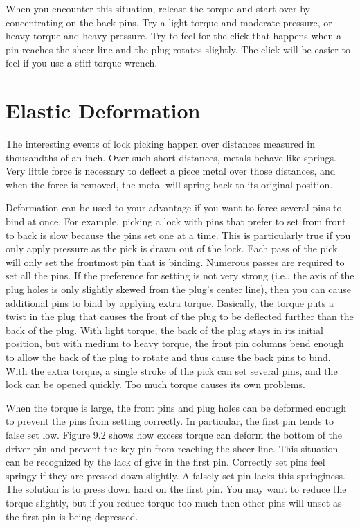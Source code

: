 When you encounter this situation, release the torque and start over by concentrating 
on the back pins. Try a light torque and moderate pressure, or heavy torque and heavy 
pressure. Try to feel for the click that happens when a pin reaches the sheer line and the 
plug rotates slightly. The click will be easier to feel if you use a stiff torque wrench.

\section{Elastic Deformation}
The interesting events of lock picking happen over distances measured in thousandths of an 
inch. Over such short distances, metals behave like springs. Very little force is necessary to deflect a piece metal over those distances, and when the force is removed, the metal will 
spring back to its original position. 

Deformation can be used to your advantage if you want to force several pins to bind at 
once. For example, picking a lock with pins that prefer to set from front to back is slow 
because the pins set one at a time. This is particularly true if you only apply pressure as 
the pick is drawn out of the lock. Each pass of the pick will only set the frontmost pin that 
is binding. Numerous passes are required to set all the pins. If the preference for setting is 
not very strong (i.e., the axis of the plug holes is only slightly skewed from the plug's center 
line), then you can cause additional pins to bind by applying extra torque. Basically, the 
torque puts a twist in the plug that causes the front of the plug to be deflected further than 
the back of the plug. With light torque, the back of the plug stays in its initial position, but 
with medium to heavy torque, the front pin columns bend enough to allow the back of the 
plug to rotate and thus cause the back pins to bind. With the extra torque, a single stroke 
of the pick can set several pins, and the lock can be opened quickly. Too much torque causes 
its own problems. 

When the torque is large, the front pins and plug holes can be deformed enough to prevent 
the pins from setting correctly. In particular, the first pin tends to false set low. Figure 9.2 
shows how excess torque can deform the bottom of the driver pin and prevent the key pin 
from reaching the sheer line. This situation can be recognized by the lack of give in the 
first pin. Correctly set pins feel springy if they are pressed down slightly. A falsely set pin 
lacks this springiness. The solution is to press down hard on the first pin. You may want to 
reduce the torque slightly, but if you reduce torque too much then other pins will unset as 
the first pin is being depressed. 


